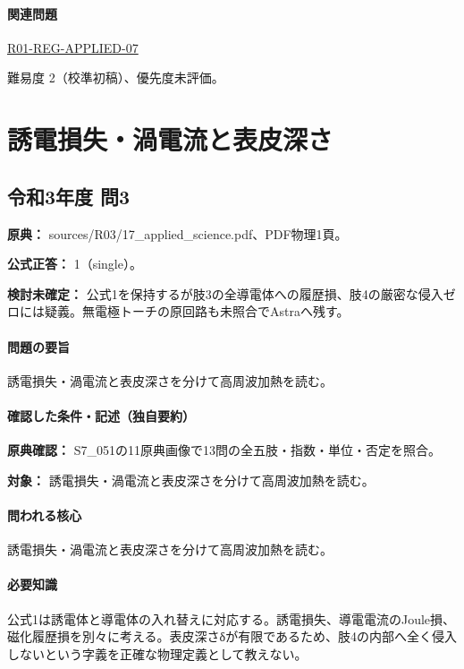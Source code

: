 \paragraph{関連問題} \hyperref[q:r01-reg-applied-07]{R01-REG-APPLIED-07}

\par 難易度 2（校準初稿）、優先度未評価。

\section{誘電損失・渦電流と表皮深さ}

\subsection{令和3年度 問3}
\label{q:r03-reg-applied-03}

\noindent\textbf{原典：} sources/R03/17\_applied\_science.pdf、PDF物理1頁。

\textbf{公式正答：} 1（single）。

\par\textbf{検討未確定：} 公式1を保持するが肢3の全導電体への履歴損、肢4の厳密な侵入ゼロには疑義。無電極トーチの原回路も未照合でAstraへ残す。

\paragraph{問題の要旨} 誘電損失・渦電流と表皮深さを分けて高周波加熱を読む。

\paragraph{確認した条件・記述（独自要約）}\mbox{}\par

\noindent\textbf{原典確認：} S7\_051の11原典画像で13問の全五肢・指数・単位・否定を照合。\par

\noindent\textbf{対象：} 誘電損失・渦電流と表皮深さを分けて高周波加熱を読む。\par

\paragraph{問われる核心} 誘電損失・渦電流と表皮深さを分けて高周波加熱を読む。

\paragraph{必要知識} 公式1は誘電体と導電体の入れ替えに対応する。誘電損失、導電電流のJoule損、磁化履歴損を別々に考える。表皮深さδが有限であるため、肢4の内部へ全く侵入しないという字義を正確な物理定義として教えない。


